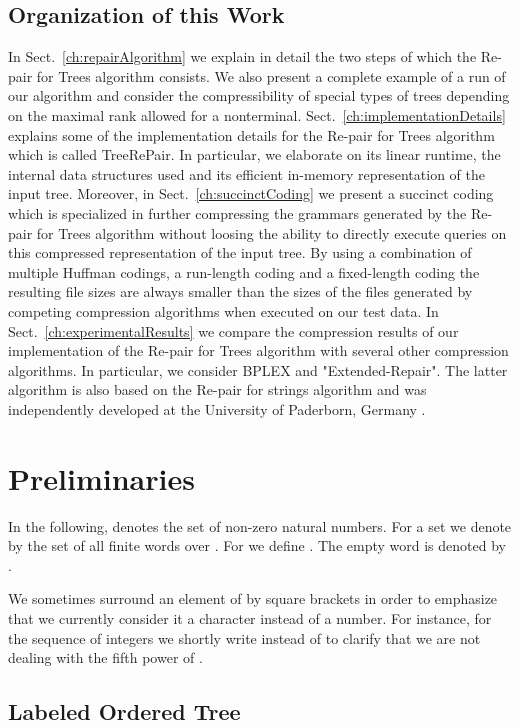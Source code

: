 \documentclass[12pt]{llncs}
\newcommand{\trp}{\mbox{TreeRePair}\xspace}
\begin{document}
\subsection{Organization of this Work}

In Sect.~\ref{ch:repairAlgorithm} we explain in detail the two steps
of which the Re-pair for Trees algorithm consists. We also present a
complete example of a run of our algorithm and consider the
compressibility of special types of trees depending on the maximal
rank allowed for a nonterminal. Sect.~\ref{ch:implementationDetails}
explains some of the implementation details for the Re-pair for Trees
algorithm which is called \trp. In particular, we elaborate on its
linear runtime, the internal data structures used and its efficient
in-memory representation of the input tree. Moreover, in
Sect.~\ref{ch:succinctCoding} we present a succinct coding which is
specialized in further compressing the grammars generated by the
Re-pair for Trees algorithm without loosing the ability to directly
execute queries on this compressed representation of the input
tree. By using a combination of multiple Huffman codings, a run-length
coding and a fixed-length coding the resulting file sizes are always
smaller than the sizes of the files generated by competing compression
algorithms when executed on our test data. In
Sect.~\ref{ch:experimentalResults} we compare the compression results
of our implementation of the Re-pair for Trees algorithm with several
other compression algorithms. In particular, we consider BPLEX and
"Extended-Repair". The latter algorithm is also based on the Re-pair
for strings algorithm and was independently developed at the
University of Paderborn, Germany \cite{Krislin08repair,Boettcher10clustering}. 


\section{Preliminaries}

In the following,  denotes
the set of non-zero natural numbers. For a set  we denote by 
 the set of all finite words over . 
For  we define . 
The empty word is denoted by .

We sometimes surround an element of  by square brackets in
order to emphasize that we currently consider it a character instead
of a number. For instance, for the sequence of integers 
 we shortly write  instead of  to clarify that we are not dealing with the fifth power of .

\subsection{Labeled Ordered Tree}
\end{document}
